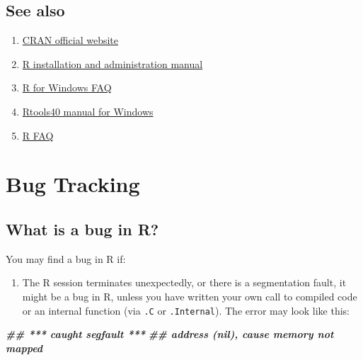 \documentclass[
]{book}
\newenvironment{Shaded}{\begin{snugshade}}{\end{snugshade}}
\newcommand{\DocumentationTok}[1]{\textcolor[rgb]{0.56,0.35,0.01}{\textbf{\textit{#1}}}}
\providecommand{\tightlist}{%
  \setlength{\itemsep}{0pt}\setlength{\parskip}{0pt}}
\begin{document}
\hypertarget{see-also}{%
\section{See also}\label{see-also}}

\begin{enumerate}
\def\labelenumi{\arabic{enumi}.}
\item
  \href{https://cran.r-project.org}{CRAN official website}
\item
  \href{https://cran.r-project.org/doc/manuals/r-patched/R-admin.html}{R installation and administration manual}
\item
  \href{https://cran.r-project.org/bin/windows/base/rw-FAQ.html}{R for Windows FAQ}
\item
  \href{https://cran.r-project.org/bin/windows/Rtools/}{Rtools40 manual for Windows}
\item
  \href{https://cran.r-project.org/doc/FAQ/R-FAQ.html}{R FAQ}
\end{enumerate}

\hypertarget{BugTrack}{%
\chapter{Bug Tracking}\label{BugTrack}}

\hypertarget{what-is-a-bug-in-r}{%
\section{What is a bug in R?}\label{what-is-a-bug-in-r}}

You may find a bug in R if:

\begin{enumerate}
\def\labelenumi{\arabic{enumi}.}
\tightlist
\item
  The R session terminates unexpectedly, or there is a segmentation fault, it might be a bug in R, unless you have written your own call to compiled code or an internal function (via \texttt{.C} or \texttt{.Internal}). The error may look like this:
\end{enumerate}

\begin{Shaded}
\begin{Highlighting}[]
\DocumentationTok{\#\#  *** caught segfault ***}
\DocumentationTok{\#\# address (nil), cause \textquotesingle{}memory not mapped\textquotesingle{}}
\end{Highlighting}
\end{Shaded}
\end{document}

